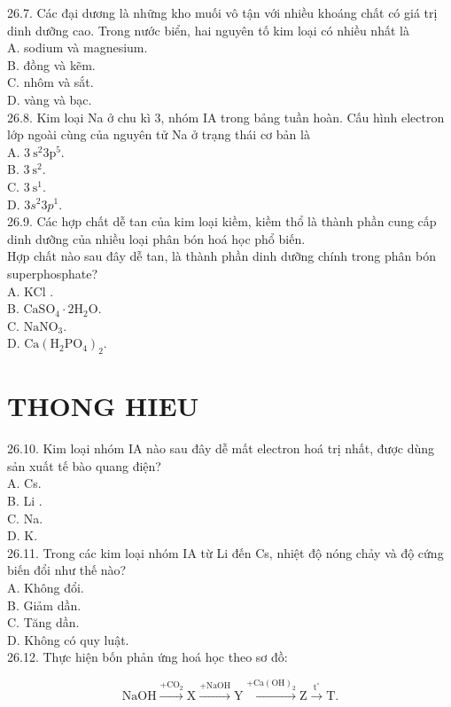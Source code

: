 \documentclass[10pt]{article}
\begin{document}
26.7. Các đại dương là những kho muối vô tận với nhiều khoáng chất có giá trị dinh dưỡng cao. Trong nước biển, hai nguyên tố kim loại có nhiều nhất là\\
A. sodium và magnesium.\\
B. đồng và kẽm.\\
C. nhôm và sắt.\\
D. vàng và bạc.\\
26.8. Kim loại Na ở chu kì 3, nhóm IA trong bảng tuần hoàn. Cấu hình electron lớp ngoài cùng của nguyên tử Na ở trạng thái cơ bản là\\
A. $3 \mathrm{~s}^{2} 3 \mathrm{p}^{5}$.\\
B. $3 \mathrm{~s}^{2}$.\\
C. $3 \mathrm{~s}^{1}$.\\
D. $3 s^{2} 3 p^{1}$.\\
26.9. Các hợp chất dễ tan của kim loại kiềm, kiềm thổ là thành phần cung cấp dinh dưỡng của nhiều loại phân bón hoá học phổ biến.\\
Hợp chất nào sau đây dễ tan, là thành phần dinh dưỡng chính trong phân bón superphosphate?\\
A. KCl .\\
B. $\mathrm{CaSO}_{4} \cdot 2 \mathrm{H}_{2} \mathrm{O}$.\\
C. $\mathrm{NaNO}_{3}$.\\
D. $\mathrm{Ca}\left(\mathrm{H}_{2} \mathrm{PO}_{4}\right)_{2}$.

\section*{THONG HIEU}
26.10. Kim loại nhóm IA nào sau đây dễ mất electron hoá trị nhất, được dùng sản xuất tế bào quang điện?\\
A. Cs.\\
B. Li .\\
C. Na.\\
D. K.\\
26.11. Trong các kim loại nhóm IA từ Li đến Cs, nhiệt độ nóng chảy và độ cứng biến đổi như thế nào?\\
A. Không đổi.\\
B. Giảm dần.\\
C. Tăng dần.\\
D. Không có quy luật.\\
26.12. Thực hiện bốn phản ứng hoá học theo sơ đồ:

$$
\mathrm{NaOH} \xrightarrow{+\mathrm{CO}_{2}} \mathrm{X} \xrightarrow{+\mathrm{NaOH}} \mathrm{Y} \xrightarrow{+\mathrm{Ca}(\mathrm{OH})_{2}} \mathrm{Z} \xrightarrow{\mathrm{t}^{\circ}} \mathrm{T} .
$$
\end{document}
